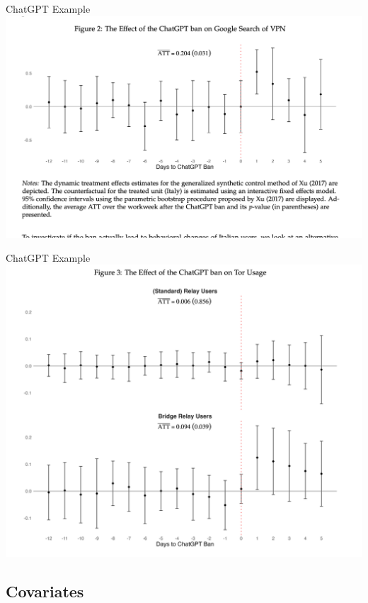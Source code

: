 \documentclass{beamer}
\begin{document}
\begin{frame}{ChatGPT Example}
             \includegraphics[scale=0.375]{./lecture_includes/gpt_vpn}

\end{frame}

\begin{frame}{ChatGPT Example}
             \includegraphics[scale=0.3]{./lecture_includes/gpt_tor}

\end{frame}


\subsection{Covariates}
\end{document}
